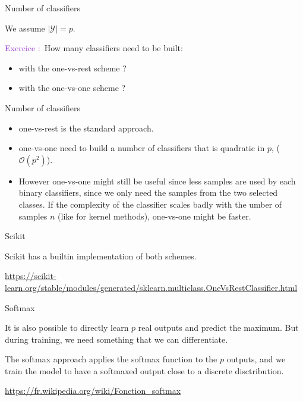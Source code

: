 \documentclass[usenames,dvipsnames]{beamer}
\newcounter{numexos}%
\newcommand{\exercice}[1]{%
\addtocounter{numexos}{1}%
\textcolor{DarkOrchid}{Exercice\,\thenumexos\,:}\,#1%
}
\begin{document}
\begin{frame}{Number of classifiers}

    We assume $ | \mathcal{Y} | = p$.

    \exercice{\textbf{}}How many classifiers  need to be built:
    \begin{itemize}
        \item with the one-vs-rest scheme ?
        \item with the one-vs-one scheme ?
    \end{itemize}
\end{frame}

\begin{frame}{Number of classifiers}

    \begin{itemize}
        \item one-vs-rest is the standard approach.
        \item one-vs-one need to build a number of classifiers that is
            quadratic in $p$, ($\mathcal{O} (p^2)$).
        \item However one-vs-one might still be useful since less samples are
            used by each binary classifiers, since we only need the samples
            from the two selected classes. If the complexity of the classifier
            scales badly with the umber of samples $n$ (like for kernel
            methods), one-vs-one might be faster.
    \end{itemize}
    

\end{frame}

\begin{frame}{Scikit}

    Scikit has a builtin implementation of both schemes.

    \url{https://scikit-learn.org/stable/modules/generated/sklearn.multiclass.OneVsRestClassifier.html} 
    
\end{frame}

\begin{frame}{Softmax}

    It is also possible to directly learn $p$ real outputs and predict the maximum. But during training, we need something that we can differentiate.

    The softmax approach applies the softmax function to the $p$ outputs, and we train the model to have a softmaxed output close to a discrete disctribution.

    \url{https://fr.wikipedia.org/wiki/Fonction_softmax} 
\end{frame}
\end{document}
